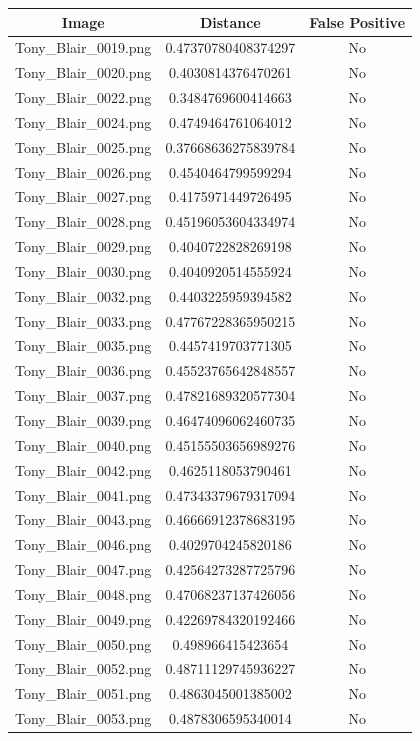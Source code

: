 \documentclass[12pt]{article}
\begin{document}
\begin{center}
\begin{tabular}{ccc}
Image & Distance & False Positive \\
\hline
Tony\_Blair\_0019.png & 0.47370780408374297 & No\\
Tony\_Blair\_0020.png & 0.4030814376470261 & No\\
Tony\_Blair\_0022.png & 0.3484769600414663 & No\\
Tony\_Blair\_0024.png & 0.4749464761064012 & No\\
Tony\_Blair\_0025.png & 0.37668636275839784 & No\\
Tony\_Blair\_0026.png & 0.4540464799599294 & No\\
Tony\_Blair\_0027.png & 0.4175971449726495 & No\\
Tony\_Blair\_0028.png & 0.45196053604334974 & No\\
Tony\_Blair\_0029.png & 0.4040722828269198 & No\\
Tony\_Blair\_0030.png & 0.4040920514555924 & No\\
Tony\_Blair\_0032.png & 0.4403225959394582 & No\\
Tony\_Blair\_0033.png & 0.47767228365950215 & No\\
Tony\_Blair\_0035.png & 0.4457419703771305 & No\\
Tony\_Blair\_0036.png & 0.45523765642848557 & No\\
Tony\_Blair\_0037.png & 0.47821689320577304 & No\\
Tony\_Blair\_0039.png & 0.46474096062460735 & No\\
Tony\_Blair\_0040.png & 0.45155503656989276 & No\\
Tony\_Blair\_0042.png & 0.4625118053790461 & No\\
Tony\_Blair\_0041.png & 0.47343379679317094 & No\\
Tony\_Blair\_0043.png & 0.46666912378683195 & No\\
Tony\_Blair\_0046.png & 0.4029704245820186 & No\\
Tony\_Blair\_0047.png & 0.42564273287725796 & No\\
Tony\_Blair\_0048.png & 0.47068237137426056 & No\\
Tony\_Blair\_0049.png & 0.42269784320192466 & No\\
Tony\_Blair\_0050.png & 0.498966415423654 & No\\
Tony\_Blair\_0052.png & 0.48711129745936227 & No\\
Tony\_Blair\_0051.png & 0.4863045001385002 & No\\
Tony\_Blair\_0053.png & 0.4878306595340014 & No\\

\end{tabular}
\end{center}
\end{document}
